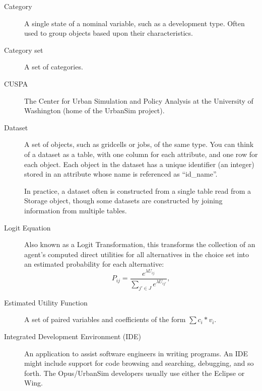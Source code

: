 \begin{description}
\item[Category] 
A single state of a nominal variable, such as a development type.
Often used to group objects based upon their characteristics. 

\item[Category set] 
A set of categories.

\item[CUSPA]  
The Center for Urban Simulation and Policy Analysis at the University of Washington
(home of the UrbanSim project).

\item[Dataset] \datasetindex
A set of objects, such as gridcells or jobs, of the same type.
You can think of a dataset \datasetindex as a table, with one column
for each attribute, \attributesindex and one row for each object.  
Each object in the dataset \datasetindex has a unique identifier (an integer) stored in
an attribute \attributesindex whose name is referenced as ``id_name''. \datasetindex  

In practice, a dataset \datasetindex often is constructed from a single
table read from a Storage object, though some datasets \datasetindex
are constructed by joining information from multiple tables.

\item[Logit Equation] 
Also known as a Logit Transformation, this transforms the
collection of an agent's computed direct utilities for all
alternatives in the choice set into an estimated probability for
each alternative:
\begin{equation}
    P_{ij}=\frac{e^{\lambda U_{ij}}}{\sum_{j' \in J}e^{\lambda
    U_{ij'}}},
\end{equation}

\item[Estimated Utility Function] 
A set of paired variables \variablesindex and coefficients \coefficientsindex of the form $\sum
c_{i}*v_{i}$.

\item[Integrated Development Environment (IDE)]
An application to assist software engineers in writing programs.  An IDE might 
include support for code browsing and searching, debugging, and so forth.
The Opus/UrbanSim developers usually use either the 
Eclipse or 
Wing\@.


\end{description}
